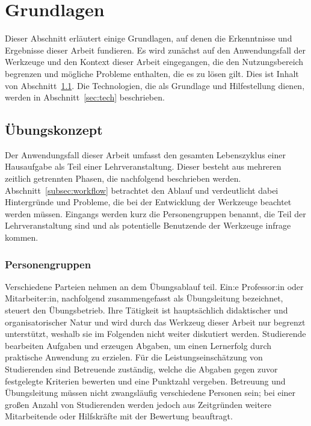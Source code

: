 \chapter{Grundlagen}\label{ch:basics}

Dieser Abschnitt erläutert einige Grundlagen, auf denen die Erkenntnisse und Ergebnisse dieser Arbeit fundieren.
Es wird zunächst auf den Anwendungsfall der Werkzeuge und den Kontext dieser Arbeit eingegangen, die den Nutzungsbereich begrenzen und mögliche Probleme enthalten, die es zu lösen gilt.
Dies ist Inhalt von Abschnitt~\ref{sec:programming-assignments}.
Die Technologien, die als Grundlage und Hilfestellung dienen, werden in Abschnitt~\ref{sec:tech} beschrieben.

\section{Übungskonzept}\label{sec:programming-assignments}

Der Anwendungsfall dieser Arbeit umfasst den gesamten Lebenszyklus einer Hausaufgabe als Teil einer Lehrveranstaltung.
Dieser besteht aus mehreren zeitlich getrennten Phasen, die nachfolgend beschrieben werden.
Abschnitt~\ref{subsec:workflow} betrachtet den Ablauf und verdeutlicht dabei Hintergründe und Probleme, die bei der Entwicklung der Werkzeuge beachtet werden müssen.
Eingangs werden kurz die Personengruppen benannt, die Teil der Lehrveranstaltung sind und als potentielle Benutzende der Werkzeuge infrage kommen.

\subsection{Personengruppen}\label{subsec:people}

Verschiedene Parteien nehmen an dem Übungsablauf teil.
Ein:e Professor:in oder Mitarbeiter:in, nachfolgend zusammengefasst als Übungsleitung bezeichnet, steuert den Übungsbetrieb.
Ihre Tätigkeit ist hauptsächlich didaktischer und organisatorischer Natur und wird durch das Werkzeug dieser Arbeit nur begrenzt unterstützt, weshalb sie im Folgenden nicht weiter diskutiert werden.
Studierende bearbeiten Aufgaben und erzeugen Abgaben, um einen Lernerfolg durch praktische Anwendung zu erzielen.
Für die Leistungseinschätzung von Studierenden sind Betreuende zuständig, welche die Abgaben gegen zuvor festgelegte Kriterien bewerten und eine Punktzahl vergeben.
Betreuung und Übungsleitung müssen nicht zwangsläufig verschiedene Personen sein;
bei einer großen Anzahl von Studierenden werden jedoch aus Zeitgründen weitere Mitarbeitende oder Hilfskräfte mit der Bewertung beauftragt.

